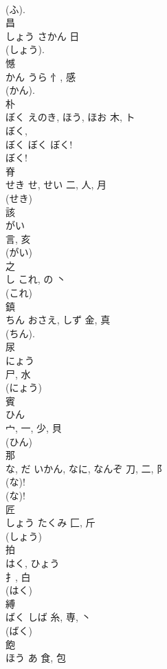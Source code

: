 \documentclass[8pt]{extreport}
\begin{document}
\begin{CJK}{UTF8}{min}
\\	(ふ). 
\\	昌	
\\	しょう	さかん	日	
\\	(しょう). 
\\	憾	
\\	かん	うら	忄, 感	
\\	(かん). 
\\	朴	
\\	ぼく	えのき, ほう, ほお	木, ト	
\\	ぼく, 
\\	ぼく ぼく ぼく!
\\	ぼく!	
\\	脊	
\\	せき	せ, せい	二, 人, 月	
\\	(せき) 
\\	該	
\\	がい	
\\	言, 亥	
\\	(がい) 
\\	之	
\\	し	これ, の	丶		
\\	(これ) 
\\	鎮	
\\	ちん	おさえ, しず	金, 真	
\\	(ちん). 
\\	尿	
\\	にょう	
\\	尸, 水	
\\	(にょう)
\\	賓	
\\	ひん	
\\	宀, 一, 少, 貝	
\\	(ひん) 
\\	那	
\\	な, だ	いかん, なに, なんぞ	刀, 二, 阝	
\\	(な)! 
\\	(な)!	
\\	匠	
\\	しょう	たくみ	匚, 斤	
\\	(しょう) 
\\	拍	
\\	はく, ひょう	
\\	扌, 白	
\\	(はく) 
\\	縛	
\\	ばく	しば	糸, 専, 丶	
\\	(ばく) 
\\	飽	
\\	ほう	あ	食, 包	

\end{CJK}
\end{document}
